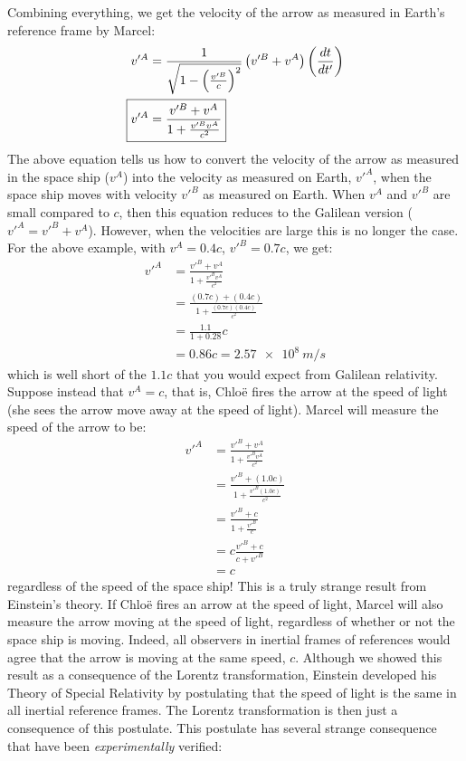Combining everything, we get the velocity of the arrow as measured in Earth's reference frame by Marcel:
\begin{align}
\label{eqn:chap3:LorentzV}
v'^A&=\frac{1}{\sqrt{1-\left(\frac{v'^B}{c}\right)^2}}\left( v'^B+v^A \right)\left(\frac{dt}{dt'}\right)\nonumber\\
\Aboxed{v'^A&=\frac{v'^B+v^A}{1+\frac{v'^Bv^A}{c^2}}}
\end{align}
The above equation tells us how to convert the velocity of the arrow as measured in the space ship ($v^A$) into the velocity as measured on Earth, $v'^A$, when the space ship moves with velocity $v'^B$ as measured on Earth. When $v^A$ and $v'^B$ are small compared to $c$, then this equation reduces to the Galilean version ($v'^A=v'^B+v^A$). However, when the velocities are large this is no longer the case. For the above example, with $v^A=0.4c$, $v'^B=0.7c$, we get:
\begin{align*}
v'^A&=\frac{v'^B+v^A}{1+\frac{v'^Bv^A}{c^2}}\\
&=\frac{(0.7c)+(0.4c)}{1+\frac{(0.7c)(0.4c)}{c^2}}\\
&=\frac{1.1}{1+0.28}c\\
&=0.86c=\SI{2.57e8}{m/s}
\end{align*}
which is well short of the $1.1c$ that you would expect from Galilean relativity. Suppose instead that $v^A=c$, that is, Chlo\"e fires the arrow at the speed of light (she sees the arrow move away at the speed of light). Marcel will measure the speed of the arrow to be:
\begin{align*}
v'^A&=\frac{v'^B+v^A}{1+\frac{v'^Bv^A}{c^2}}\\
&=\frac{v'^B+(1.0c)}{1+\frac{v'^B(1.0c)}{c^2}}\\
&=\frac{v'^B+c}{1+\frac{v'^B}{c}}\\
&=c \frac{v'^B+c}{c+v'^B}\\
&=c
\end{align*}
regardless of the speed of the space ship! This is a truly strange result from Einstein's theory. If Chlo\"e fires an arrow at the speed of light, Marcel will also measure the arrow moving at the speed of light, regardless of whether or not the space ship is moving. Indeed, all observers in inertial frames of references would agree that the arrow is moving at the same speed, $c$. Although we showed this result as a consequence of the Lorentz transformation, Einstein developed his Theory of Special Relativity by postulating that the speed of light is the same in all inertial reference frames. The Lorentz transformation is then just a consequence of this postulate. This postulate has several strange consequence that have been \textit{experimentally} verified:
